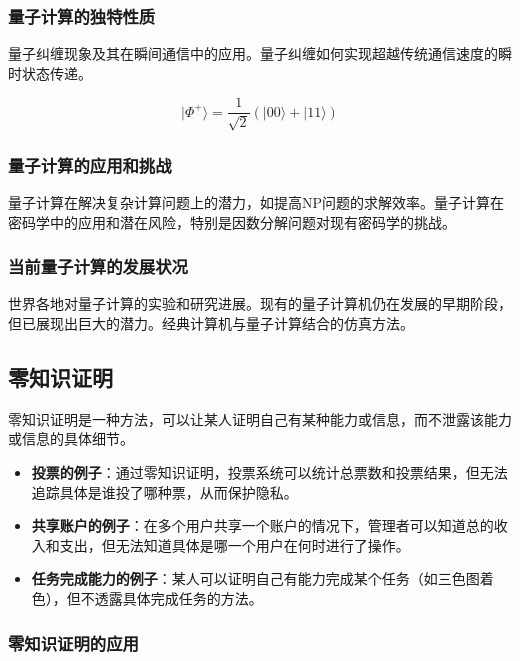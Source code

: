 \documentclass[UTF-8,a4paper,9pt]{article}
\begin{document}
\subsubsection{量子计算的独特性质}

量子纠缠现象及其在瞬间通信中的应用。量子纠缠如何实现超越传统通信速度的瞬时状态传递。

\begin{equation}
  |\Phi^+\rangle = \frac{1}{\sqrt{2}} (|00\rangle + |11\rangle)
\end{equation}

\subsubsection{量子计算的应用和挑战}

量子计算在解决复杂计算问题上的潜力，如提高NP问题的求解效率。量子计算在密码学中的应用和潜在风险，特别是因数分解问题对现有密码学的挑战。

\subsubsection{当前量子计算的发展状况}

世界各地对量子计算的实验和研究进展。现有的量子计算机仍在发展的早期阶段，但已展现出巨大的潜力。经典计算机与量子计算结合的仿真方法。

\subsection{零知识证明}

零知识证明是一种方法，可以让某人证明自己有某种能力或信息，而不泄露该能力或信息的具体细节。

\begin{itemize}
  \item \textbf{投票的例子}：通过零知识证明，投票系统可以统计总票数和投票结果，但无法追踪具体是谁投了哪种票，从而保护隐私。
  \item \textbf{共享账户的例子}：在多个用户共享一个账户的情况下，管理者可以知道总的收入和支出，但无法知道具体是哪一个用户在何时进行了操作。
  \item \textbf{任务完成能力的例子}：某人可以证明自己有能力完成某个任务（如三色图着色），但不透露具体完成任务的方法。
\end{itemize}

\subsubsection{零知识证明的应用}
\end{document}
